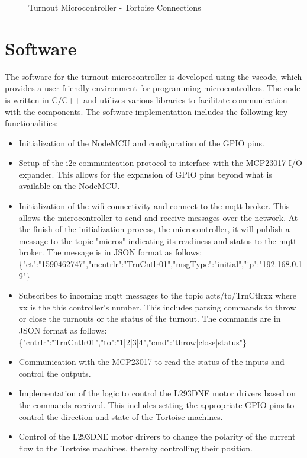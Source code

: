 \begin{figure}[H]
  \caption{Turnout Microcontroller - Tortoise Connections}
  \label{fig:turnout-board}
\end{figure}

\section{Software}
The software for the turnout microcontroller is developed using the \gls{vscode}, which provides a user-friendly environment for programming microcontrollers. The code is written in C/C++ and utilizes various 
libraries to facilitate communication with the components.
The software implementation includes the following key functionalities:
\begin{itemize}
\item Initialization of the NodeMCU and configuration of the GPIO pins.
\item Setup of the \gls{i2c} communication protocol to interface with the MCP23017 I/O expander. This allows for the expansion of GPIO pins beyond what is available on the NodeMCU.
\item Initialization of the \gls{wifi} connectivity and connect to the \gls{mqtt} broker. This allows the microcontroller to send and receive messages over the network.
At the finish of the initialization process, the microcontroller, it will publish a message to the topic "micros" indicating its readiness and status to the \gls{mqtt} broker. The message is in JSON format as follows:\\
\{"et":"1590462747","mcntrlr":"TrnCntlr01","msgType":"initial","ip":"192.168.0.19"\}
\item Subscribes to incoming \gls{mqtt} messages to the topic acts/to/TrnCtlrxx where xx is the this controller's number. This includes parsing commands to throw or close the turnouts or the status of the turnout. 
The commands are in JSON format as follows:\\
\{"cntrlr":"TrnCntlr01","to":"1|2|3|4","cmd":"throw|close|status"\}
\item Communication with the MCP23017 to read the status of the inputs and control the outputs.
\item Implementation of the logic to control the L293DNE motor drivers based on the commands received. This includes setting the appropriate GPIO pins to control the direction and state of the Tortoise machines.
\item Control of the L293DNE motor drivers to change the polarity of the current flow to the Tortoise machines, thereby controlling their position.

\end{itemize}
